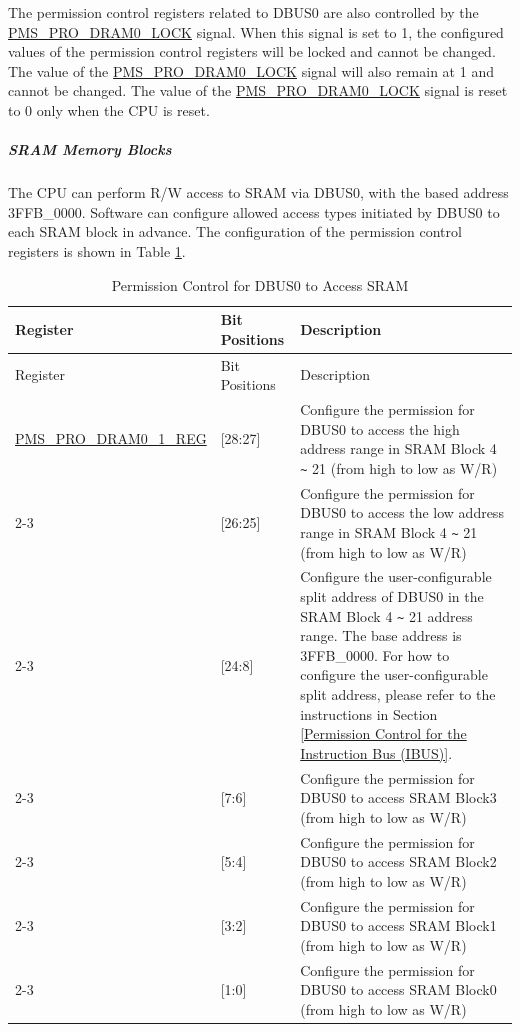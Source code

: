 \documentclass[main\_\_EN.tex]{subfiles}
\begin{document}
The permission control registers related to DBUS0 are also controlled by the \hyperref[fielddesc:PMSPRODRAM0LOCK]{PMS\_PRO\_DRAM0\_LOCK} signal. When this signal is set to 1, the configured values of the permission control registers will be locked and cannot be changed. The value of the \hyperref[fielddesc:PMSPRODRAM0LOCK]{PMS\_PRO\_DRAM0\_LOCK} signal will also remain at 1 and cannot be changed. The value of the \hyperref[fielddesc:PMSPRODRAM0LOCK]{PMS\_PRO\_DRAM0\_LOCK} signal is reset to 0 only when the CPU is reset.

\subparagraph{SRAM Memory Blocks}\label{DUBS0PermissionControl}
The CPU can perform R/W access to SRAM via DBUS0, with the based address \hexprefix{}3FFB\_0000. Software can configure allowed access types initiated by DBUS0 to each SRAM block in advance. The configuration of the permission control registers is shown in Table \ref{table:DBUS0_Permission Control_for_SRAM}.

\begin{longtable}[h]{|p{4.5cm}|p{2cm}|p{9.5cm}|}
    \caption{Permission Control for DBUS0 to Access SRAM}
    \label{table:DBUS0_Permission Control_for_SRAM}
    \\\hline
    \rowcolor{lightgray}
    Register & Bit Positions & Description \\
    \hline
    \endfirsthead

    \hline
    \rowcolor{lightgray}
    Register & Bit Positions & Description \\
    \hline
    \endhead

    \endfoot

    \hline
    \endlastfoot

    \hyperref[regdesc:PMSPRODRAM01REG]{PMS\_PRO\_DRAM0\_1\_REG} & [28:27] & Configure the permission for DBUS0 to access the high address range in SRAM Block 4 \verb+~+ 21 (from high to low as W/R)\\
    \cline{2-3}
    & [26:25] & Configure the permission for DBUS0 to access the low address range in SRAM Block 4 \verb+~+ 21 (from high to low as W/R)\\
    \cline{2-3}
    & [24:8] & Configure the user-configurable split address of DBUS0 in the SRAM Block 4 \verb+~+ 21 address range. The base address is \hexprefix{}3FFB\_0000. For how to configure the user-configurable split address, please refer to the instructions in Section \ref{Permission Control for the Instruction Bus (IBUS)}. \\
    \cline{2-3}
    & [7:6] & Configure the permission for DBUS0 to access SRAM Block3 (from high to low as W/R)\\
    \cline{2-3}
    & [5:4] & Configure the permission for DBUS0 to access SRAM Block2 (from high to low as W/R)\\
    \cline{2-3}
    & [3:2] & Configure the permission for DBUS0 to access SRAM Block1 (from high to low as W/R)\\
    \cline{2-3}
    & [1:0] & Configure the permission for DBUS0 to access SRAM Block0 (from high to low as W/R)\\
    \hline

\end{longtable}
\end{document}
